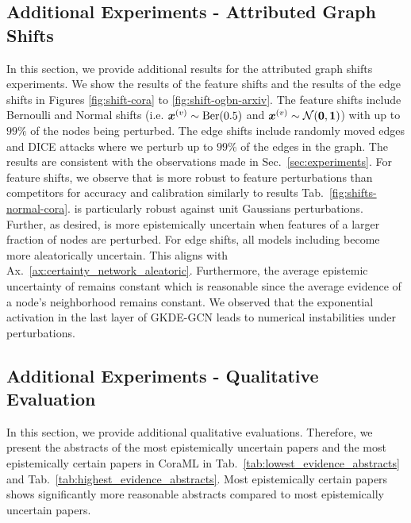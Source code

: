 \subsection{Additional Experiments - Attributed Graph Shifts}

In this section, we provide additional results for the attributed graph shifts experiments. We show the results of the feature shifts and the results of the edge shifts in Figures \ref{fig:shift-cora} to \ref{fig:shift-ogbn-arxiv}. The feature shifts include Bernoulli and Normal shifts (i.e. $\bm{x}^{(v)} \sim \operatorname{Ber}(0.5)$ and $\bm{x}^{(v)} \sim \operatorname{\mathcal{N}}(\bm{0}, \bm{1})$) with up to $99\%$ of the nodes being perturbed. The edge shifts include randomly moved edges and DICE attacks \citep{Waniek2018} where we perturb up to $99\%$ of the edges in the graph. The results are consistent with the observations made in Sec.~\ref{sec:experiments}. For feature shifts, we observe that \GPNacro{} is more robust to feature perturbations than competitors for accuracy and calibration similarly to results Tab.~\ref{fig:shifts-normal-cora}. \GPNacro{} is particularly robust against unit Gaussians perturbations. Further, as desired, \GPNacro{} is more epistemically uncertain when features of a larger fraction of nodes are perturbed. For edge shifts, all models including \GPNacro{} become more aleatorically uncertain. This aligns with Ax.~\ref{ax:certainty_network_aleatoric}. Furthermore, the average epistemic uncertainty of \GPNacro{} remains constant which is reasonable since the average evidence of a node's neighborhood remains constant. We observed that the exponential activation in the last layer of GKDE-GCN leads to numerical instabilities under perturbations.
%








%

\subsection{Additional Experiments - Qualitative Evaluation}
\label{sec:add-exp-qualitative}

In this section, we provide additional qualitative evaluations. Therefore, we present the abstracts of the most epistemically uncertain papers and the most epistemically certain papers in CoraML in Tab.~\ref{tab:lowest_evidence_abstracts} and Tab.~\ref{tab:highest_evidence_abstracts}. Most epistemically certain papers shows significantly more reasonable abstracts compared to most epistemically uncertain papers.

